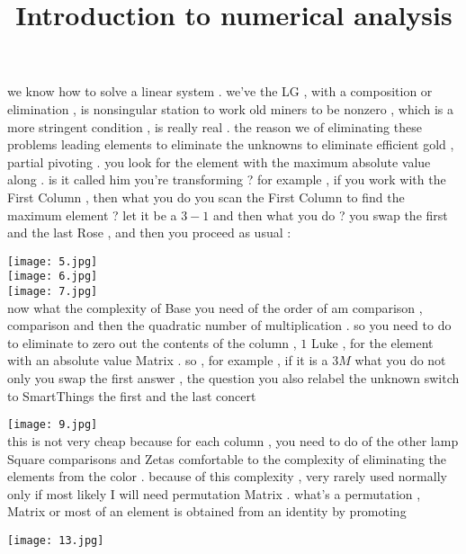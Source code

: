 \documentclass{article}
\title{Introduction to numerical analysis}
\begin{document}
\maketitle



we know how to solve a linear system . we've the LG , with a composition or elimination , is nonsingular station to work old miners to be nonzero , which is a more stringent condition , is really real . the reason we of eliminating these problems leading elements to eliminate the unknowns to eliminate efficient gold , partial pivoting . you look for the element with the maximum absolute value along . is it called him you're transforming ? for example , if you work with the First Column , then what you do you scan the First Column to find the maximum element ? let it be a $3-1$ and then what you do ? you swap the first and the last Rose , and then you proceed as usual :

\texttt{[image: 5.jpg]}\\



\texttt{[image: 6.jpg]}\\



\texttt{[image: 7.jpg]}\\

now what the complexity of Base you need of the order of am comparison , comparison and then the quadratic number of multiplication . so you need to do to eliminate to zero out the contents of the column , $1$ Luke , for the element with an absolute value Matrix . so , for example , if it is a $3M$ what you do not only you swap the first answer , the question you also relabel the unknown switch to SmartThings the first and the last concert

\texttt{[image: 9.jpg]}\\

this is not very cheap because for each column , you need to do of the other lamp Square comparisons and Zetas comfortable to the complexity of eliminating the elements from the color . because of this complexity , very rarely used normally only if most likely I will need permutation Matrix . what's a permutation , Matrix or most of an element is obtained from an identity by promoting

\texttt{[image: 13.jpg]}\\
\end{document}
